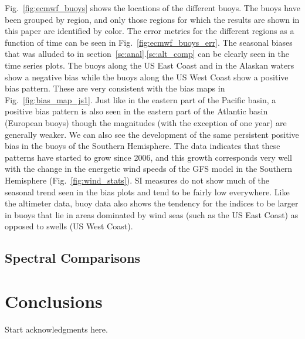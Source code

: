 \documentclass[12pt]{article}
\begin{document}
Fig.~\ref{fig:ecmwf_buoys} shows the locations of the different
buoys. The buoys have been grouped by region, and only those regions
for which the results are shown in this paper are identified by
color. The error metrics for the different regions as a function of
time can be seen in Fig.~\ref{fig:ecmwf_buoys_err}. The seasonal
biases that was alluded to in section~\ref{sc:anal}.\ref{sc:alt_comp}
can be clearly seen in the time series plots. The buoys along the US
East Coast and in the Alaskan waters show a negative bias while the
buoys along the US West Coast show a positive bias pattern. These are
very consistent with the bias maps in
Fig.~\ref{fig:bias_map_js1}. Just like in the eastern part of the
Pacific basin, a positive bias pattern is also seen in the eastern
part of the Atlantic basin (European buoys) though the magnitudes
(with the exception of one year) are generally weaker. We can also see
the development of the same persistent positive bias in the buoys of
the Southern Hemisphere. The data indicates that these patterns have
started to grow since 2006, and this growth corresponds very well with
the change in the energetic wind speeds of the GFS model in the
Southern Hemisphere (Fig.~\ref{fig:wind_stats}). SI measures do not
show much of the seasonal trend seen in the bias plots and tend to be
fairly low everywhere. Like the altimeter data, buoy data also shows
the tendency for the indices to be larger in buoys that lie in areas
dominated by wind seas (such as the US East Coast) as opposed to
swells (US West Coast).

\subsection{Spectral Comparisons}

\section{Conclusions}

\begin{acknowledgment} 
Start acknowledgments here.
\end{acknowledgment}

\end{document}
